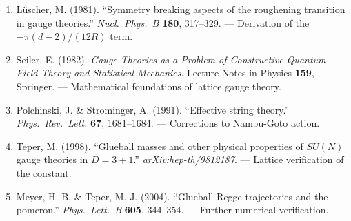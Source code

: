 \begin{enumerate}
\item L\"uscher, M. (1981). ``Symmetry breaking aspects of the roughening 
transition in gauge theories.'' \emph{Nucl.\ Phys.\ B} \textbf{180}, 317--329.
--- Derivation of the $-\pi(d-2)/(12R)$ term.

\item Seiler, E. (1982). \emph{Gauge Theories as a Problem of Constructive 
Quantum Field Theory and Statistical Mechanics}. Lecture Notes in Physics 
\textbf{159}, Springer.
--- Mathematical foundations of lattice gauge theory.

\item Polchinski, J. \& Strominger, A. (1991). ``Effective string theory.'' 
\emph{Phys.\ Rev.\ Lett.} \textbf{67}, 1681--1684.
--- Corrections to Nambu-Goto action.

\item Teper, M. (1998). ``Glueball masses and other physical properties of 
$SU(N)$ gauge theories in $D=3+1$.'' \emph{arXiv:hep-th/9812187}.
--- Lattice verification of the constant.

\item Meyer, H. B. \& Teper, M. J. (2004). ``Glueball Regge trajectories and 
the pomeron.'' \emph{Phys.\ Lett.\ B} \textbf{605}, 344--354.
--- Further numerical verification.
\end{enumerate}





